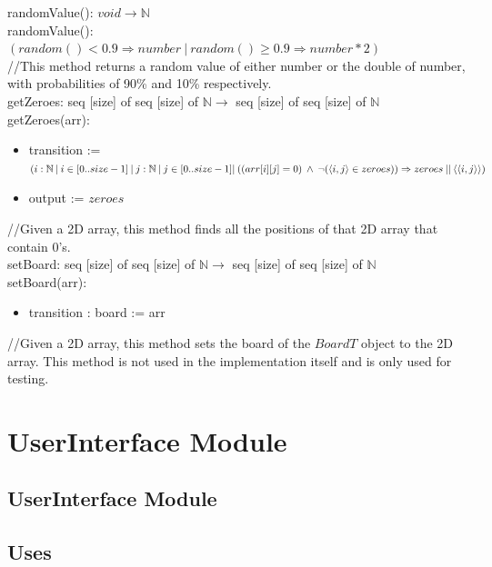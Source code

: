 \documentclass[12pt]{article}
\begin{document}
\noindent randomValue(): $void \rightarrow \mathbb{N}$\\
randomValue(): $(random() < 0.9 \Rightarrow number \: | \: random() \ge 0.9 \Rightarrow number*2)$
\medskip
\\//This method returns a random value of either number or the double of number, with probabilities of 90\% and 10\% respectively.\\

\noindent getZeroes: seq [size] of seq [size] of $\mathbb{N} \rightarrow$ seq [size] of seq [size] of $\mathbb{N}$\\
getZeroes(arr):
\begin{itemize}
    \item transition := \\$(i : \mathbb{N} \: | \: i \in [0..size-1] \: | \: j : \mathbb{N} \: | \: j \in [0..size-1]\\ | \: ((arr [i] [j] = 0) \: \land \: \neg (\langle i,j \rangle \in zeroes)) \Rightarrow zeroes \: || \: \langle \langle i,j \rangle \rangle)$
    \item output := $zeroes$
\end{itemize}
\medskip
//Given a 2D array, this method finds all the positions of that 2D array that contain 0's.\\

\noindent setBoard: seq [size] of seq [size] of $\mathbb{N} \rightarrow$ seq [size] of seq [size] of $\mathbb{N}$\\
setBoard(arr):
\begin{itemize}
    \item transition : board := arr
\end{itemize}
\medskip
//Given a 2D array, this method sets the board of the $BoardT$ object to the 2D array. This method is not used in the implementation itself and is only used for testing.

\newpage

\section* {UserInterface Module}

\subsection* {UserInterface Module}

\subsection* {Uses}
\end{document}
